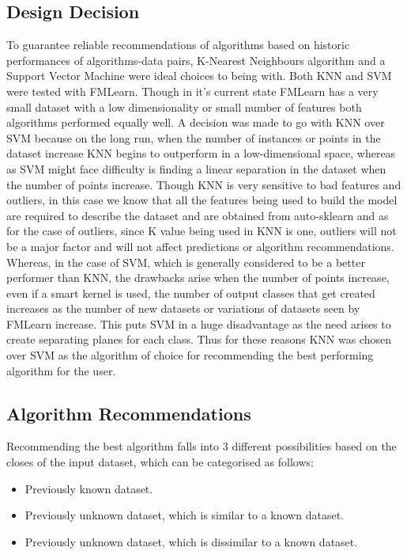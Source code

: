 \subsection*{Design Decision}
To guarantee reliable recommendations of algorithms based on historic performances of algorithms-data pairs, K-Nearest Neighbours algorithm and a Support Vector Machine were ideal choices to being with. Both KNN and SVM were tested with FMLearn. Though in it's current state FMLearn has a very small dataset with a low dimensionality or small number of features both algorithms performed equally well. A decision was made to go with KNN over SVM because on the long run, when the number of instances or points in the dataset increase KNN begins to outperform in a low-dimensional space, whereas as SVM might face difficulty is finding a linear separation in the dataset when the number of points increase. Though KNN is very sensitive to bad features and outliers, in this case we know that all the features being used to build the model are required to describe the dataset and are obtained from auto-sklearn and as for the case of outliers, since K value being used in KNN is one, outliers will not be a major factor and will not affect predictions or algorithm recommendations. Whereas, in the case of SVM, which is generally considered to be a better performer than KNN, the drawbacks arise when the number of points increase, even if a smart kernel is used, the number of output classes that get created increases as the number of new datasets or variations of datasets seen by FMLearn increase. This puts SVM in a huge disadvantage as the need arises to create separating planes for each class. Thus for these reasons KNN was chosen over SVM as the algorithm of choice for recommending the best performing algorithm for the user.

\subsection*{Algorithm Recommendations}

Recommending the best algorithm falls into 3 different possibilities based on the closes of the input dataset, which can be categorised as follows:
\begin{itemize}
    \item Previously known dataset.
    \item Previously unknown dataset, which is similar to a known dataset.
    \item Previously unknown dataset, which is dissimilar to a known dataset.
\end{itemize}

